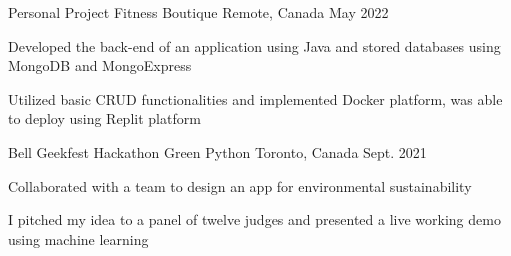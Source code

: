 \begin{cventries}
  \cventry
    {Personal Project}
    {Fitness Boutique}
    {Remote, Canada}
    {May 2022}
    {
      \begin{cvitems}
        \item {Developed the back-end of an application using Java and stored databases using MongoDB and MongoExpress
        \item Utilized basic CRUD functionalities and implemented Docker platform, was able to deploy using Replit platform}      
        \end{cvitems}
    }
  \cventry
    {Bell Geekfest Hackathon}
    {Green Python}
    {Toronto, Canada}
    {Sept. 2021}
    {
      \begin{cvitems}
        \item {Collaborated with a team to design an app for environmental sustainability
        \item I pitched my idea to a panel of twelve judges and presented a live working demo using machine learning}      
        \end{cvitems}
    }
\end{cventries}